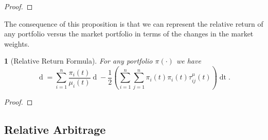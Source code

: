\documentclass[british]{amsart} \usepackage{lmodern}
\numberwithin{equation}{section} \numberwithin{figure}{section}
\theoremstyle{plain} \newtheorem{thm}{\protect\theoremname}[section]
\theoremstyle{definition} \newtheorem{defn}[thm]{\protect\definitionname}
\theoremstyle{plain} \newtheorem{assumption}[thm]{\protect\assumptionname}
\theoremstyle{plain} \newtheorem{lem}[thm]{\protect\lemmaname}
\theoremstyle{plain} \newtheorem{prop}[thm]{\protect\propositionname}
\theoremstyle{remark} \newtheorem{rem}[thm]{\protect\remarkname}
\theoremstyle{plain} \newtheorem{cor}[thm]{\protect\corollaryname}
\renewcommand{\d}[1]{\mathop{\mathrm{d}{#1}}}
\newcommand{\defeq}{\mathop{\triangleq}} \newcommand{\almostsurely}{\text{a.s.}}
\begin{document}
\begin{proof}
%
%
%
%
%
%
%

\end{proof}

The consequence of this proposition is that we can represent the relative 
return of any portfolio versus the market portfolio in terms of the changes 
in the market weights.

\begin{thm} [Relative Return Formula] For any portfolio $\pi(\cdot)$ we have
  \begin{equation*} 
    \d{ \log{ \left( \frac{ V^{\pi}(t) }{ V^{\mu}(t) } \right) }} = 
    \sum_{i=1}^{n} \frac{\pi_{i}(t)}{\mu_{i}(t)} \d{\mu_{i}(t)} - 
    \frac{1}{2} \left( 
        \sum_{i=1}^{n} \sum_{j=1}^{n} \pi_{i}(t) \pi_{i}(t) \tau_{ij}^{\mu}(t)
    \right) \d{t}. 
  \end{equation*} 
\end{thm}

\begin{proof} 
\end{proof}

\subsection{Relative Arbitrage}
\end{document}

